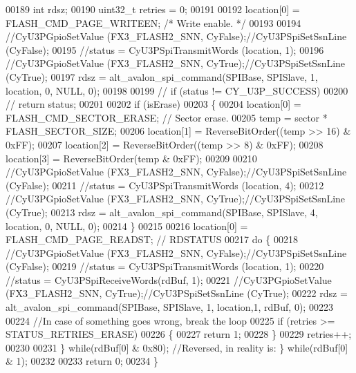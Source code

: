 \begin{DoxyCode}
00189     \textcolor{keywordtype}{int} rdsz;
00190     uint32\_t retries = 0;
00191 
00192     location[0] = FLASH_CMD_PAGE_WRITEEN;  \textcolor{comment}{/* Write enable. */}
00193 
00194     \textcolor{comment}{//CyU3PGpioSetValue (FX3\_FLASH2\_SNN, CyFalse);//CyU3PSpiSetSsnLine (CyFalse);}
00195     \textcolor{comment}{//status = CyU3PSpiTransmitWords (location, 1);}
00196     \textcolor{comment}{//CyU3PGpioSetValue (FX3\_FLASH2\_SNN, CyTrue);//CyU3PSpiSetSsnLine (CyTrue);}
00197     rdsz = alt_avalon_spi_command(SPIBase, SPISlave, 1, location, 0, NULL, 0);
00198 
00199 \textcolor{comment}{//    if (status != CY\_U3P\_SUCCESS)}
00200 \textcolor{comment}{//        return status;}
00201 
00202     \textcolor{keywordflow}{if} (isErase)
00203     \{
00204         location[0] = FLASH_CMD_SECTOR_ERASE; \textcolor{comment}{// Sector erase.}
00205         temp        = sector * FLASH_SECTOR_SIZE;
00206         location[1] = ReverseBitOrder((temp >> 16) & 0xFF);
00207         location[2] = ReverseBitOrder((temp >> 8) & 0xFF);
00208         location[3] = ReverseBitOrder(temp & 0xFF);
00209 
00210         \textcolor{comment}{//CyU3PGpioSetValue (FX3\_FLASH2\_SNN, CyFalse);//CyU3PSpiSetSsnLine (CyFalse);}
00211         \textcolor{comment}{//status = CyU3PSpiTransmitWords (location, 4);}
00212         \textcolor{comment}{//CyU3PGpioSetValue (FX3\_FLASH2\_SNN, CyTrue);//CyU3PSpiSetSsnLine (CyTrue);}
00213         rdsz = alt_avalon_spi_command(SPIBase, SPISlave, 4, location, 0, NULL, 0);
00214     \}
00215 
00216     location[0] = FLASH_CMD_PAGE_READST; \textcolor{comment}{// RDSTATUS}
00217     \textcolor{keywordflow}{do} \{
00218         \textcolor{comment}{//CyU3PGpioSetValue (FX3\_FLASH2\_SNN, CyFalse);//CyU3PSpiSetSsnLine (CyFalse);}
00219         \textcolor{comment}{//status = CyU3PSpiTransmitWords (location, 1);}
00220         \textcolor{comment}{//status = CyU3PSpiReceiveWords(rdBuf, 1);}
00221         \textcolor{comment}{//CyU3PGpioSetValue (FX3\_FLASH2\_SNN, CyTrue);//CyU3PSpiSetSsnLine (CyTrue);}
00222         rdsz = alt_avalon_spi_command(SPIBase, SPISlave, 1, location,1, rdBuf, 0);
00223 
00224         \textcolor{comment}{//In case of something goes wrong, break the loop}
00225         \textcolor{keywordflow}{if} (retries >= STATUS_RETRIES_ERASE)
00226         \{
00227             \textcolor{keywordflow}{return} 1;
00228         \}
00229         retries++;
00230 
00231     \} \textcolor{keywordflow}{while}(rdBuf[0] & 0x80);   \textcolor{comment}{//Reversed, in reality is: \} while(rdBuf[0] & 1);}
00232 
00233     \textcolor{keywordflow}{return} 0;
00234 \}
\end{DoxyCode}
